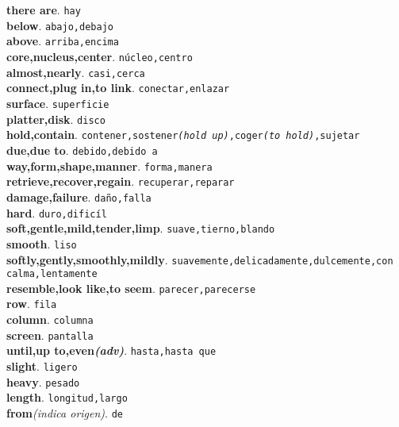 \documentclass[twocolumn]{article}
\begin{document}
	\textsf{\textbf{there are}}. \texttt{hay}\\
	\textsf{\textbf{below}}. \texttt{abajo,debajo}\\
	\textsf{\textbf{above}}. \texttt{arriba,encima}\\
	\textsf{\textbf{core,nucleus,center}}. \texttt{n\'ucleo,centro}\\
	\textsf{\textbf{almost,nearly}}. \texttt{casi,cerca}\\
	\textsf{\textbf{connect,plug in,to link}}. \texttt{conectar,enlazar}\\
	\textsf{\textbf{surface}}. \texttt{superficie}\\
	\textsf{\textbf{platter,disk}}. \texttt{disco}\\
	\textsf{\textbf{hold,contain}}. \texttt{contener,sostener{\scriptsize \textit{(hold up)}},coger{\scriptsize \textit{(to hold)}},sujetar}\\
	\textsf{\textbf{due,due to}}. \texttt{debido,debido a}\\
	\textsf{\textbf{way,form,shape,manner}}. \texttt{forma,manera}\\
	\textsf{\textbf{retrieve,recover,regain}}. \texttt{recuperar,reparar}\\
	\textsf{\textbf{damage,failure}}. \texttt{da\~no,falla}\\
	\textsf{\textbf{hard}}. \texttt{duro,dific\'il}\\
	\textsf{\textbf{soft,gentle,mild,tender,limp}}. \texttt{suave,tierno,blando}\\
	\textsf{\textbf{smooth}}. \texttt{liso}\\
	\textsf{\textbf{softly,gently,smoothly,mildly}}. \texttt{suavemente,delicadamente,dulcemente,con calma,lentamente}\\
	\textsf{\textbf{resemble,look like,to seem}}. \texttt{parecer,parecerse}\\
	\textsf{\textbf{row}}. \texttt{fila}\\
	\textsf{\textbf{column}}. \texttt{columna}\\
	\textsf{\textbf{screen}}. \texttt{pantalla}\\
	\textsf{\textbf{until,up to,even{\scriptsize \textit{(adv)}}}}. \texttt{hasta,hasta que}\\
	\textsf{\textbf{slight}}. \texttt{ligero}\\
	\textsf{\textbf{heavy}}. \texttt{pesado}\\
	\textsf{\textbf{length}}. \texttt{longitud,largo}\\
	\textsf{\textbf{from}}{\scriptsize \textit{(indica origen)}}. \texttt{de}\\
\end{document}
